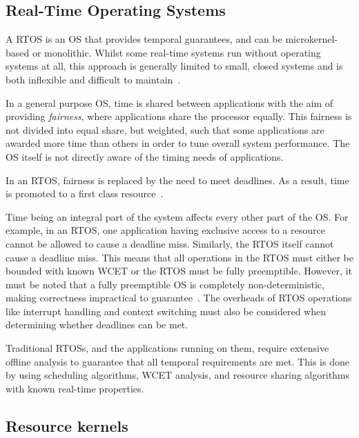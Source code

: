 \subsection{Real-Time Operating Systems}

A \gls{RTOS} is an \gls{OS} that provides temporal guarantees, and can be microkernel-based or
monolithic.  Whilst some real-time systems run without operating systems at all, this approach is
generally limited to small, closed systems and is both inflexible and difficult to
maintain~\citep{Lui_AACBBBCLM_04}.

In a general purpose \gls{OS}, time is shared between applications with the aim of providing
\emph{fairness}, where applications share the processor equally.  This fairness is not divided into
equal share, but weighted, such that some applications are awarded more time than others in order
to tune overall system performance.  The \gls{OS} itself is not directly aware of the timing needs of
applications.

In an \gls{RTOS}, fairness is replaced by the need to meet deadlines. As a result, time is promoted
to a first class resource~\citep{Stankovic_88}.

Time being an integral part of the system affects every other part of the \gls{OS}.  For example, in
an \gls{RTOS}, one application having exclusive access to a resource cannot be allowed to cause a
deadline miss.  Similarly, the \gls{RTOS} itself cannot cause a deadline miss.  This means that all
operations in the \gls{RTOS} must either be bounded with known {\gls{WCET}} or the \gls{RTOS} must
be fully preemptible.  However, it must be noted that a fully preemptible \gls{OS} is completely
non-deterministic, making correctness impractical to guarantee~\citep{Blackham_TH_12}.  The overheads
of \gls{RTOS} operations like interrupt handling and context switching must also be considered when
determining whether deadlines can be met.

Traditional \glspl{RTOS}, and the applications running on them, require extensive offline analysis
to guarantee that all temporal requirements are met.  This is done by using scheduling algorithms,
\gls{WCET} analysis, and resource sharing algorithms with known real-time properties.

\subsection{Resource kernels}
\label{sec:resource-kernels}

